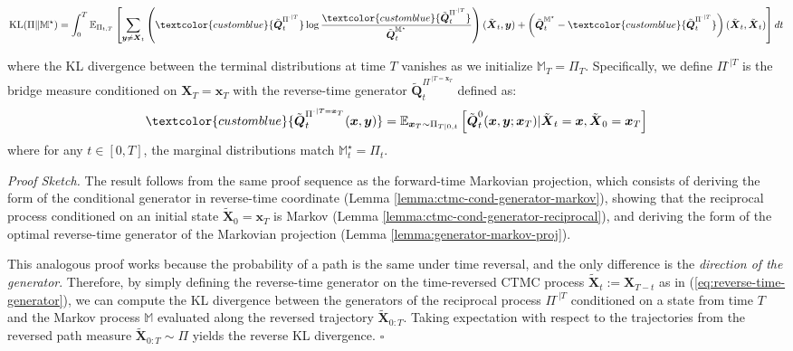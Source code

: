 \documentclass{article}
\newcommand{\bluetext}[1]{\textcolor{customblue}{#1}}
\begin{document}
\begin{definition}
    \begin{small}
    \begin{align}
        \text{KL}(\Pi\|\mathbb{M}^\star)=\int_0^T\mathbb{E}_{\Pi_{t,T}}\left[\sum_{\boldsymbol{y}\neq \boldsymbol{X}_t}\left(\bluetext{\tilde{\boldsymbol{Q}}_t^{\Pi^{\cdot |T}}}\log \frac{\bluetext{\tilde{\boldsymbol{Q}}_t^{\Pi^{\cdot|T}}}}{\tilde{\boldsymbol{Q}}_t^{\mathbb{M}^\star}}\right)(\tilde{\boldsymbol{X}}_t,\boldsymbol{y})+\left(\tilde{\boldsymbol{Q}}_t^{\mathbb{M}^\star}-\bluetext{\tilde{\boldsymbol{Q}}_t^{\Pi^{\cdot|T}}}\right)(\tilde{\boldsymbol{X}}_t,\tilde{\boldsymbol{X}}_t)\right]dt\label{eq:ctmc-markov-kl-reverse}
    \end{align}
    \end{small}
    where the KL divergence between the terminal distributions at time $T$ vanishes as we initialize $\mathbb{M}_T=\Pi_T$. Specifically, we define $\Pi^{\cdot|T}$ is the bridge measure conditioned on $\boldsymbol{X}_T=\boldsymbol{x}_T$ with the reverse-time generator $\tilde{\boldsymbol{Q}}^{\Pi^{\cdot|T=\boldsymbol{x}_T}}_t$ defined as:
    \begin{align}
        \bluetext{\tilde{\boldsymbol{Q}}^{\Pi^{\cdot|T=\boldsymbol{x}_T}}_t(\boldsymbol{x}, \boldsymbol{y})}=\mathbb{E}_{\boldsymbol{x}_T\sim \Pi_{T|0,t}}\left[\tilde{\boldsymbol{Q}}^0_t(\boldsymbol{x},\boldsymbol{y}; \boldsymbol{x}_T)|\tilde{\boldsymbol{X}}_t=\boldsymbol{x}, \tilde{\boldsymbol{X}}_0=\boldsymbol{x}_T\right]
    \end{align}
    where for any $t\in [0,T]$, the marginal distributions match $\mathbb{M}^\star_t=\Pi_t$.
\end{definition}

\textit{Proof Sketch.} The result follows from the same proof sequence as the forward-time Markovian projection, which consists of deriving the form of the conditional generator in reverse-time coordinate (Lemma \ref{lemma:ctmc-cond-generator-markov}), showing that the reciprocal process conditioned on an initial state $\tilde{\boldsymbol{X}}_0=\boldsymbol{x}_T$ is Markov (Lemma \ref{lemma:ctmc-cond-generator-reciprocal}), and deriving the form of the optimal reverse-time generator of the Markovian projection (Lemma \ref{lemma:generator-markov-proj}). 

This analogous proof works because the probability of a path is the same under time reversal, and the only difference is the \textit{direction of the generator}. Therefore, by simply defining the reverse-time generator on the time-reversed CTMC process $\tilde{\boldsymbol{X}}_t:=\boldsymbol{X}_{T-t}$ as in (\ref{eq:reverse-time-generator}), we can compute the KL divergence between the generators of the reciprocal process $\Pi^{\cdot|T}$ conditioned on a state from time $T$ and the Markov process $\mathbb{M}$ evaluated along the reversed trajectory $\tilde{\boldsymbol{X}}_{0:T}$. Taking expectation with respect to the trajectories from the reversed path measure $\tilde{\boldsymbol{X}}_{0:T}\sim \Pi$ yields the reverse KL divergence. \hfill $\square$
\end{document}
